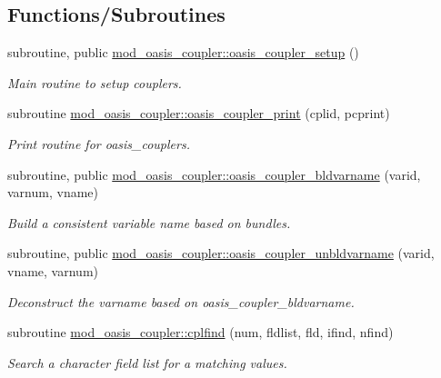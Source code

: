 \subsection*{Functions/\+Subroutines}
\begin{DoxyCompactItemize}
\item 
subroutine, public \hyperlink{namespacemod__oasis__coupler_ab48c4d4ee118f948ccc286eec5b509ec}{mod\+\_\+oasis\+\_\+coupler\+::oasis\+\_\+coupler\+\_\+setup} ()
\begin{DoxyCompactList}\small\item\em Main routine to setup couplers. \end{DoxyCompactList}\item 
subroutine \hyperlink{namespacemod__oasis__coupler_a5cb96db0ae7b837db934689a49df3da6}{mod\+\_\+oasis\+\_\+coupler\+::oasis\+\_\+coupler\+\_\+print} (cplid, pcprint)
\begin{DoxyCompactList}\small\item\em Print routine for oasis\+\_\+couplers. \end{DoxyCompactList}\item 
subroutine, public \hyperlink{namespacemod__oasis__coupler_a65adf0558cfd9a9d316bd22ad1f9dc23}{mod\+\_\+oasis\+\_\+coupler\+::oasis\+\_\+coupler\+\_\+bldvarname} (varid, varnum, vname)
\begin{DoxyCompactList}\small\item\em Build a consistent variable name based on bundles. \end{DoxyCompactList}\item 
subroutine, public \hyperlink{namespacemod__oasis__coupler_ad8c9a74a349ea4420ac38e2da2dc3cd2}{mod\+\_\+oasis\+\_\+coupler\+::oasis\+\_\+coupler\+\_\+unbldvarname} (varid, vname, varnum)
\begin{DoxyCompactList}\small\item\em Deconstruct the varname based on oasis\+\_\+coupler\+\_\+bldvarname. \end{DoxyCompactList}\item 
subroutine \hyperlink{namespacemod__oasis__coupler_a773e323d2275aff227e05e98ce97def1}{mod\+\_\+oasis\+\_\+coupler\+::cplfind} (num, fldlist, fld, ifind, nfind)
\begin{DoxyCompactList}\small\item\em Search a character field list for a matching values. \end{DoxyCompactList}\end{DoxyCompactItemize}
